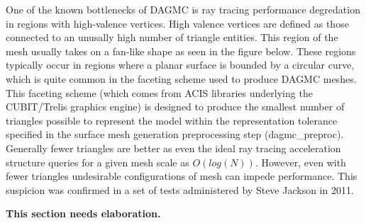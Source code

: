 \documentclass[10pt, a4paper]{article}
\begin{document}
One of the known bottlenecks of DAGMC is ray tracing performance degredation in regions with high-valence vertices. High valence vertices are defined as those connected to an unusally high number of triangle entities. This region of the mesh usually takes on a fan-like shape as seen in the figure below. These regions typically occur in regions where a planar surface is bounded by a circular curve, which is quite common in the faceting scheme used to produce DAGMC meshes. This faceting scheme (which comes from ACIS libraries underlying the CUBIT/Trelis graphics engine) is designed to produce the smallest number of triangles possible to represent the model within the representation tolerance specified in the surface mesh generation preprocessing step (dagmc\_preproc). Generally fewer triangles are better as even the ideal ray tracing acceleration structure queries for a given mesh scale as $O(log(N))$. However, even with fewer triangles undesirable configurations of mesh can impede performance. This suspicion was confirmed in a set of tests administered by Steve Jackson in 2011.

\textbf{This section needs elaboration.}
\end{document}
